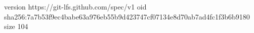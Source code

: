version https://git-lfs.github.com/spec/v1
oid sha256:7a7b53f9ec4babe63a976eb55b9d423747cf07134e8d70ab7ad4fc1f3b6b9180
size 104

